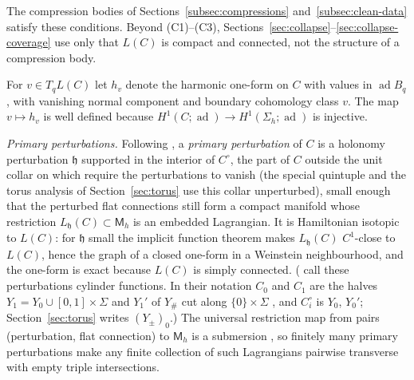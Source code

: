 \documentclass[11pt]{amsart}
\theoremstyle{definition}
\theoremstyle{remark}
\theoremstyle{plain}
\numberwithin{equation}{section}
\newcommand{\ad}{\operatorname{ad}}
\newcommand{\Msf}{\mathsf{M}}
\begin{document}
The compression bodies of Sections~\ref{subsec:compressions}
and~\ref{subsec:clean-data} satisfy these conditions. Beyond (C1)--(C3), Sections~\ref{sec:collapse}--\ref{sec:collapse-coverage}
use only that $L(C)$ is compact and connected, not the structure of a compression
body.

For $v\in T_qL(C)$ let $h_v$ denote the harmonic one-form on $C$ with
values in $\ad B_q$, with vanishing normal component and boundary
cohomology class $v$. The map $v\mapsto h_v$ is well defined because
$H^1(C;\ad)\to H^1(\Sigma_h;\ad)$ is injective.

\emph{Primary perturbations.} Following \cite[Section~2.3]{DFL}, a
\emph{primary perturbation} of $C$ is a holonomy perturbation $\mathfrak h$
supported in the interior of $C^\circ$, the part of $C$ outside the unit collar on which
\cite[(2.1) and p.~9]{DFL} require the perturbations to vanish (the special quintuple
and the torus analysis of Section~\ref{sec:torus} use this collar unperturbed), small
enough that the perturbed flat
connections still form a compact manifold whose restriction
$L_{\mathfrak h}(C)\subset\Msf_h$ is an embedded Lagrangian. It is Hamiltonian isotopic
to $L(C)$: for $\mathfrak h$ small the implicit function theorem makes $L_{\mathfrak h}(C)$
$C^1$-close to $L(C)$, hence the graph of a closed one-form in a Weinstein
neighbourhood, and the one-form is exact because $L(C)$ is simply connected.
(\cite{DFL} call these perturbations cylinder functions. In their notation $C_0$ and $C_1$
are the halves $Y_1=Y_0\cup[0,1]\times\Sigma$ and $Y_1'$ of $Y_\#$ cut along $\{0\}\times\Sigma$
\cite[p.~79]{DFL}, and $C_i^\circ$ is $Y_0$, $Y_0'$; Section~\ref{sec:torus} writes $(Y_\pm)_0$.) The universal restriction map from pairs (perturbation, flat
connection) to $\Msf_h$ is a submersion \cite[Section~2.3]{DFL}, so
finitely many primary perturbations make any finite collection of such
Lagrangians pairwise transverse with empty triple intersections.
\end{document}
